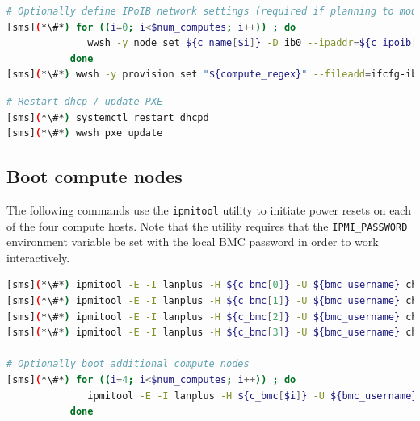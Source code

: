 \documentclass[letterpaper]{article}
\begin{document}
\begin{lstlisting}[language=bash,keywords={},upquote=true,basicstyle=\footnotesize\ttfamily]
# Optionally define IPoIB network settings (required if planning to mount Lustre over IB)
[sms](*\#*) for ((i=0; i<$num_computes; i++)) ; do
              wwsh -y node set ${c_name[$i]} -D ib0 --ipaddr=${c_ipoib[$i]} --netmask=${ipoib_netmask}
           done
[sms](*\#*) wwsh -y provision set "${compute_regex}" --fileadd=ifcfg-ib0.ww
\end{lstlisting}

\clearpage
\begin{lstlisting}[language=bash,keywords={},upquote=true,basicstyle=\footnotesize\ttfamily]
# Restart dhcp / update PXE
[sms](*\#*) systemctl restart dhcpd
[sms](*\#*) wwsh pxe update
\end{lstlisting}





\subsection{Boot compute nodes} \label{sec:boot_computes}

 
The following commands use the \texttt{ipmitool} utility to initiate power
resets on each of the four compute hosts. Note that the utility requires that
the \texttt{IPMI\_PASSWORD} environment variable be set with the local BMC password in
order to work interactively.

\begin{lstlisting}[language=bash,keywords={},upquote=true]
[sms](*\#*) ipmitool -E -I lanplus -H ${c_bmc[0]} -U ${bmc_username} chassis power reset   # power cycle c1
[sms](*\#*) ipmitool -E -I lanplus -H ${c_bmc[1]} -U ${bmc_username} chassis power reset   # power cycle c2
[sms](*\#*) ipmitool -E -I lanplus -H ${c_bmc[2]} -U ${bmc_username} chassis power reset   # power cycle c3
[sms](*\#*) ipmitool -E -I lanplus -H ${c_bmc[3]} -U ${bmc_username} chassis power reset   # power cycle c4

# Optionally boot additional compute nodes
[sms](*\#*) for ((i=4; i<$num_computes; i++)) ; do
              ipmitool -E -I lanplus -H ${c_bmc[$i]} -U ${bmc_username} chassis power reset
           done
\end{lstlisting} 
\end{document}

